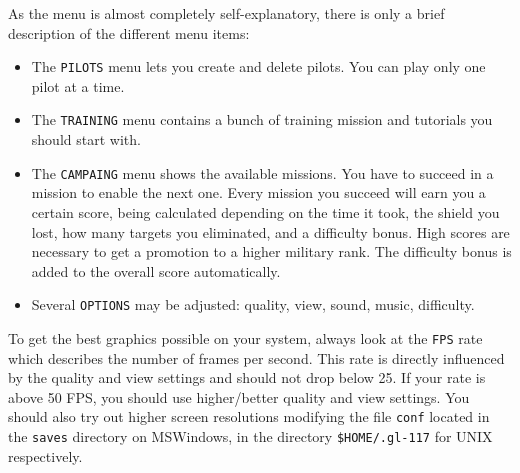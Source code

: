 As the menu is almost completely self-explanatory, there is only a brief
description of the different menu items:
\begin{itemize}
\item{The \texttt{PILOTS} menu lets you create and delete pilots. You can
play only one pilot at a time.}
\item{The \texttt{TRAINING} menu contains a bunch of training mission and tutorials you should start with.}
\item{The \texttt{CAMPAING} menu shows the available missions. You have to
succeed in a mission to enable the next one.
Every mission you succeed will earn you a certain score, being calculated
depending on the time it took, the shield you lost, how many targets you
eliminated, and a difficulty bonus.
High scores are necessary to get a promotion to a higher military rank.
The difficulty bonus is added to the overall score automatically.}
\item{Several \texttt{OPTIONS} may be adjusted: quality, view, sound, music,
difficulty.}
\end{itemize}

To get the best graphics possible on your system, always look at the
\texttt{FPS} rate which describes the number of frames per second.
This rate is directly influenced by the quality and view settings and
should not drop below 25. If your rate is above 50 FPS, you should
use higher/better quality and view settings.
You should also try out higher screen resolutions modifying the file
\texttt{conf} located in the \texttt{saves}
directory on MSWindows, in the directory \texttt{\$HOME/.gl-117} for UNIX respectively.
